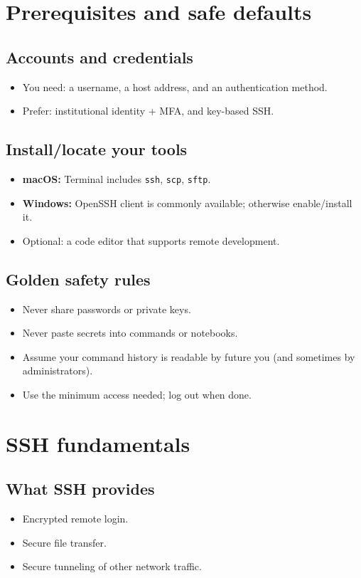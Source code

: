 \section{Prerequisites and safe defaults}
\subsection{Accounts and credentials}
\begin{itemize}
\item You need: a username, a host address, and an authentication method.
\item Prefer: institutional identity + MFA, and key-based SSH.
\end{itemize}

\subsection{Install/locate your tools}
\begin{itemize}
\item \textbf{macOS:} Terminal includes \texttt{ssh}, \texttt{scp}, \texttt{sftp}.
\item \textbf{Windows:} OpenSSH client is commonly available; otherwise enable/install it.
\item Optional: a code editor that supports remote development.
\end{itemize}

\subsection{Golden safety rules}
\begin{itemize}
\item Never share passwords or private keys.
\item Never paste secrets into commands or notebooks.
\item Assume your command history is readable by future you (and sometimes by administrators).
\item Use the minimum access needed; log out when done.
\end{itemize}

\section{SSH fundamentals}
\subsection{What SSH provides}
\begin{itemize}
\item Encrypted remote login.
\item Secure file transfer.
\item Secure tunneling of other network traffic.
\end{itemize}

